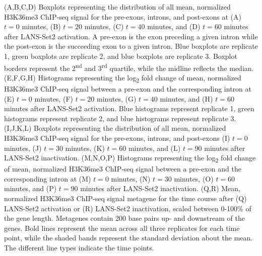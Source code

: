 \documentclass[11pt]{biorxiv}
\begin{document}
\noindent (A,B,C,D) Boxplots representing the distribution of all mean, normalized H3K36me3 ChIP-seq signal for the pre-exons, introns, and post-exons at (A) $t=0$ minutes, (B) $t=20$ minutes, (C) $t=40$ minutes, and (D) $t=60$ minutes after LANS-Set2 activation. A pre-exon is the exon preceding a given intron while the post-exon is the succeeding exon to a given intron. Blue boxplots are replicate 1, green boxplots are replicate 2, and blue boxplots are replicate 3. Boxplot borders represent the 2\textsuperscript{nd} and 3\textsuperscript{rd} quartile, while the midline reflects the median. (E,F,G,H) Histograms representing the log\textsubscript{2} fold change of mean, normalized H3K36me3 ChIP-seq signal between a pre-exon and the corresponding intron at (E) $t=0$ minutes, (F) $t=20$ minutes, (G) $t=40$ minutes, and (H) $t=60$ minutes after LANS-Set2 activation. Blue histograms represent replicate 1, green histograms represent replicate 2, and blue histograms represent replicate 3. (I,J,K,L) Boxplots representing the distribution of all mean, normalized H3K36me3 ChIP-seq signal for the pre-exons, introns, and post-exons (I) $t=0$ minutes, (J) $t=30$ minutes, (K) $t=60$ minutes, and (L) $t=90$ minutes after LANS-Set2 inactivation. (M,N,O,P) Histograms representing the log\textsubscript{2} fold change of mean, normalized H3K36me3 ChIP-seq signal between a pre-exon and the corresponding intron at (M) $t=0$ minutes, (N) $t=30$ minutes, (O) $t=60$ minutes, and (P) $t=90$ minutes after LANS-Set2 inactivation. (Q,R) Mean, normalized H3K36me3 ChIP-seq signal metagene for the time course after (Q) LANS-Set2 activation or (R) LANS-Set2 inactivation, scaled between 0-100\% of the gene length. Metagenes contain 200 base pairs up- and downstream of the genes. Bold lines represent the mean across all three replicates for each time point, while the shaded bands represent the standard deviation about the mean. The different line types indicate the time points.

\clearpage
\end{document}
